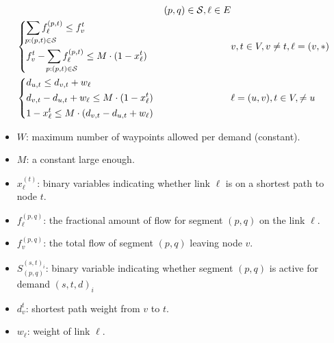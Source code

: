 \documentclass[a4paper,USenglish]{article}
\newcommand{\sub}[1]{ \hspace{-4ex}\mathrlap{#1} }
\begin{document}
\begin{align}
&&   (p,q) \in \mathcal{S},  \ell \in E
\label{LP:SPTree} 
\\
&
\begin{dcases*}
\sum_{\sub{p:(p,t) \in \mathcal{S}}} f^{(p,t)}_{\ell} \leq f^{t}_{v}	\\
f^{t}_{v} - \sum_{\sub{p:(p,t) \in \mathcal{S}}} f^{(p,t)}_{\ell} \leq 
	M \cdot (1 - x^{t}_{\ell}) 
\end{dcases*}			
&&  v,t \in V, v \neq t, \ell = (v,*)
\label{LP:equalSplit} 
\\ 
&\begin{dcases*}
d_{u,t} \leq d_{v,t} + w_{\ell} \\
d_{v,t} - d_{u,t} + w_{\ell} \leq M \cdot (1 - x^t_{\ell})	\\
1 - x^t_{\ell} \leq M \cdot (d_{v,t} - d_{u,t} + w_{\ell})
\end{dcases*}
&&  \ell = (u,v),  t \in V, \neq u
\label{LP:weights}
\end{align}



\begin{itemize}
\item
	$W$: maximum  number of waypoints allowed per demand (constant).
\item
	$M$: a constant large enough.		
\item	
	$x^{(t)}_{\ell}$:	binary variables indicating whether link $\ell$ is on a shortest path to node $t$.
\item	
	$f^{(p,q)}_{\ell}$: the fractional amount of flow for segment $(p,q)$ on the link $\ell$.
\item	
	$f^{(p,q)}_{v}$:  the total flow of segment $(p,q)$ leaving  node $v$.
\item
	$S^{(s,t)_i}_{(p,q)}$: binary variable indicating whether segment $(p,q)$ is  active for demand $(s,t,d)_i$
\item
	$d^{t}_v$: shortest path weight from $v$ to $t$.
\item	
	$w_{\ell}$: weight of link $\ell$.
\end{itemize}
\end{document}
